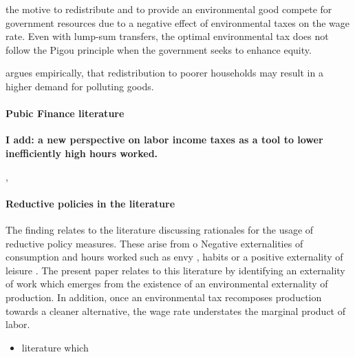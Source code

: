 \cite{Jacobs2019RedistributionCurves} the motive to redistribute and to provide an environmental good compete for government resources due to a negative effect of environmental taxes on the wage rate. Even with lump-sum transfers, the optimal environmental tax does not follow the Pigou principle when the government seeks to enhance equity.

\cite{Sager2019IncomeCurves} argues empirically, that redistribution to poorer households may result in a higher demand for polluting goods. 
\paragraph{Pubic Finance literature}
\textbf{I add: a new perspective on labor income taxes as a tool to lower inefficiently high hours worked. }

 \cite{Heathcote2017OptimalFramework}, \cite{Loebbing2019NationalChange}

\paragraph{Reductive policies in the literature}
The finding relates to the literature discussing rationales for the usage of reductive policy measures. These arise from o
Negative externalities of consumption and hours worked such as
 envy \cite{Alvarez-Cuadrado2007EnvyHours}, habits \cite{Ravn2006DeepHabits}  or a positive externality of leisure \cite{Alesina2005WorkDifferent}. The present paper relates to this literature by identifying an externality of work which emerges from the existence of an environmental externality of production. In addition, once an environmental tax recomposes production towards a cleaner alternative, the wage rate understates the marginal product of labor. 
\begin{itemize}
	\item literature which \cite{Alvarez-Cuadrado2007EnvyHours}
\end{itemize}